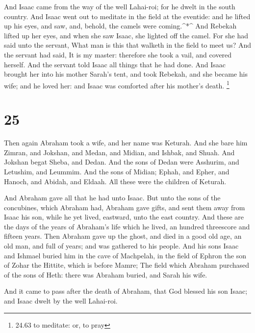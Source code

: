  And Isaac came from the way of the well Lahai-roi; for he
dwelt in the south country.  And Isaac went out to meditate
in the field at the eventide: and he lifted up his eyes, and saw, and,
behold, the camels were coming.\^{}*\^{}  And Rebekah
lifted up her eyes, and when she saw Isaac, she lighted off the camel.
 For she had said unto the servant, What man is this that
walketh in the field to meet us? And the servant had said, It is my
master: therefore she took a vail, and covered herself. 
And the servant told Isaac all things that he had done. 
And Isaac brought her into his mother Sarah's tent, and took Rebekah,
and she became his wife; and he loved her: and Isaac was comforted after
his mother's death. \footnote{24.63 to meditate: or, to pray}

\hypertarget{section-24}{%
\section{25}\label{section-24}}

 Then again Abraham took a wife, and her name was Keturah.
 And she bare him Zimran, and Jokshan, and Medan, and
Midian, and Ishbak, and Shuah.  And Jokshan begat Sheba, and
Dedan. And the sons of Dedan were Asshurim, and Letushim, and Leummim.
 And the sons of Midian; Ephah, and Epher, and Hanoch, and
Abidah, and Eldaah. All these were the children of Keturah.

 And Abraham gave all that he had unto Isaac. 
But unto the sons of the concubines, which Abraham had, Abraham gave
gifts, and sent them away from Isaac his son, while he yet lived,
eastward, unto the east country.  And these are the days of
the years of Abraham's life which he lived, an hundred threescore and
fifteen years.  Then Abraham gave up the ghost, and died in
a good old age, an old man, and full of years; and was gathered to his
people.  And his sons Isaac and Ishmael buried him in the
cave of Machpelah, in the field of Ephron the son of Zohar the Hittite,
which is before Mamre;  The field which Abraham purchased
of the sons of Heth: there was Abraham buried, and Sarah his wife.

 And it came to pass after the death of Abraham, that God
blessed his son Isaac; and Isaac dwelt by the well Lahai-roi.


